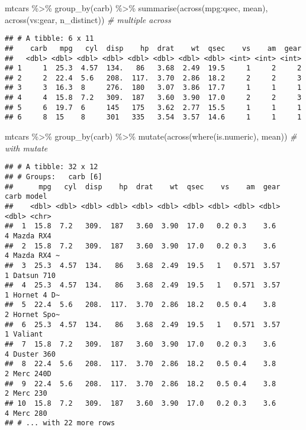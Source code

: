 \documentclass[
]{article}
\newenvironment{Shaded}{\begin{snugshade}}{\end{snugshade}}
\newcommand{\CommentTok}[1]{\textcolor[rgb]{0.56,0.35,0.01}{\textit{#1}}}
\newcommand{\FunctionTok}[1]{\textcolor[rgb]{0.00,0.00,0.00}{#1}}
\newcommand{\NormalTok}[1]{#1}
\newcommand{\SpecialCharTok}[1]{\textcolor[rgb]{0.00,0.00,0.00}{#1}}
\begin{document}
\begin{Shaded}
\begin{Highlighting}[]
\NormalTok{mtcars }\SpecialCharTok{\%\textgreater{}\%} 
  \FunctionTok{group\_by}\NormalTok{(carb) }\SpecialCharTok{\%\textgreater{}\%} 
  \FunctionTok{summarise}\NormalTok{(}\FunctionTok{across}\NormalTok{(mpg}\SpecialCharTok{:}\NormalTok{qsec, mean), }\FunctionTok{across}\NormalTok{(vs}\SpecialCharTok{:}\NormalTok{gear, n\_distinct)) }\CommentTok{\# multiple across}
\end{Highlighting}
\end{Shaded}

\begin{verbatim}
## # A tibble: 6 x 11
##    carb   mpg   cyl  disp    hp  drat    wt  qsec    vs    am  gear
##   <dbl> <dbl> <dbl> <dbl> <dbl> <dbl> <dbl> <dbl> <int> <int> <int>
## 1     1  25.3  4.57  134.   86   3.68  2.49  19.5     1     2     2
## 2     2  22.4  5.6   208.  117.  3.70  2.86  18.2     2     2     3
## 3     3  16.3  8     276.  180   3.07  3.86  17.7     1     1     1
## 4     4  15.8  7.2   309.  187   3.60  3.90  17.0     2     2     3
## 5     6  19.7  6     145   175   3.62  2.77  15.5     1     1     1
## 6     8  15    8     301   335   3.54  3.57  14.6     1     1     1
\end{verbatim}

\begin{Shaded}
\begin{Highlighting}[]
\NormalTok{mtcars }\SpecialCharTok{\%\textgreater{}\%} 
  \FunctionTok{group\_by}\NormalTok{(carb) }\SpecialCharTok{\%\textgreater{}\%} 
  \FunctionTok{mutate}\NormalTok{(}\FunctionTok{across}\NormalTok{(}\FunctionTok{where}\NormalTok{(is.numeric), mean)) }\CommentTok{\# with mutate}
\end{Highlighting}
\end{Shaded}

\begin{verbatim}
## # A tibble: 32 x 12
## # Groups:   carb [6]
##      mpg   cyl  disp    hp  drat    wt  qsec    vs    am  gear  carb model      
##    <dbl> <dbl> <dbl> <dbl> <dbl> <dbl> <dbl> <dbl> <dbl> <dbl> <dbl> <chr>      
##  1  15.8  7.2   309.  187   3.60  3.90  17.0   0.2 0.3    3.6      4 Mazda RX4  
##  2  15.8  7.2   309.  187   3.60  3.90  17.0   0.2 0.3    3.6      4 Mazda RX4 ~
##  3  25.3  4.57  134.   86   3.68  2.49  19.5   1   0.571  3.57     1 Datsun 710 
##  4  25.3  4.57  134.   86   3.68  2.49  19.5   1   0.571  3.57     1 Hornet 4 D~
##  5  22.4  5.6   208.  117.  3.70  2.86  18.2   0.5 0.4    3.8      2 Hornet Spo~
##  6  25.3  4.57  134.   86   3.68  2.49  19.5   1   0.571  3.57     1 Valiant    
##  7  15.8  7.2   309.  187   3.60  3.90  17.0   0.2 0.3    3.6      4 Duster 360 
##  8  22.4  5.6   208.  117.  3.70  2.86  18.2   0.5 0.4    3.8      2 Merc 240D  
##  9  22.4  5.6   208.  117.  3.70  2.86  18.2   0.5 0.4    3.8      2 Merc 230   
## 10  15.8  7.2   309.  187   3.60  3.90  17.0   0.2 0.3    3.6      4 Merc 280   
## # ... with 22 more rows
\end{verbatim}
\end{document}

